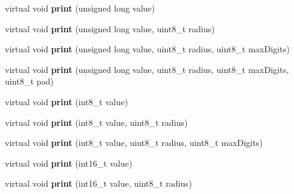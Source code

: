 \begin{DoxyCompactItemize}
\item 
virtual void {\bfseries print} (unsigned long value)\hypertarget{class_l_k_m1638_board_a7bcc87b42a36593c0dc25f96d35dd7b7}{}\label{class_l_k_m1638_board_a7bcc87b42a36593c0dc25f96d35dd7b7}

\item 
virtual void {\bfseries print} (unsigned long value, uint8\+\_\+t radius)\hypertarget{class_l_k_m1638_board_a3ad79f70f43abe6cdd93e0820451ee2e}{}\label{class_l_k_m1638_board_a3ad79f70f43abe6cdd93e0820451ee2e}

\item 
virtual void {\bfseries print} (unsigned long value, uint8\+\_\+t radius, uint8\+\_\+t max\+Digits)\hypertarget{class_l_k_m1638_board_a58d41caae5893ba5de7d0f0b1694e603}{}\label{class_l_k_m1638_board_a58d41caae5893ba5de7d0f0b1694e603}

\item 
virtual void {\bfseries print} (unsigned long value, uint8\+\_\+t radius, uint8\+\_\+t max\+Digits, uint8\+\_\+t pad)\hypertarget{class_l_k_m1638_board_a4d85c9a6d46429371f53d48d88bcf098}{}\label{class_l_k_m1638_board_a4d85c9a6d46429371f53d48d88bcf098}

\item 
virtual void {\bfseries print} (int8\+\_\+t value)\hypertarget{class_l_k_m1638_board_a3870dd214f2cf1f8fef72914caf6514f}{}\label{class_l_k_m1638_board_a3870dd214f2cf1f8fef72914caf6514f}

\item 
virtual void {\bfseries print} (int8\+\_\+t value, uint8\+\_\+t radius)\hypertarget{class_l_k_m1638_board_a3ef6e7753b0bb41fce28beb6929ff322}{}\label{class_l_k_m1638_board_a3ef6e7753b0bb41fce28beb6929ff322}

\item 
virtual void {\bfseries print} (int8\+\_\+t value, uint8\+\_\+t radius, uint8\+\_\+t max\+Digits)\hypertarget{class_l_k_m1638_board_a45e0efcafa18905ffbe54418c5bd9882}{}\label{class_l_k_m1638_board_a45e0efcafa18905ffbe54418c5bd9882}

\item 
virtual void {\bfseries print} (int16\+\_\+t value)\hypertarget{class_l_k_m1638_board_a6a528db7d882c863343ebc3113121144}{}\label{class_l_k_m1638_board_a6a528db7d882c863343ebc3113121144}

\item 
virtual void {\bfseries print} (int16\+\_\+t value, uint8\+\_\+t radius)\hypertarget{class_l_k_m1638_board_a4319c529f3c73460d711b9a1a4be7ca0}{}\label{class_l_k_m1638_board_a4319c529f3c73460d711b9a1a4be7ca0}


\end{DoxyCompactItemize}
